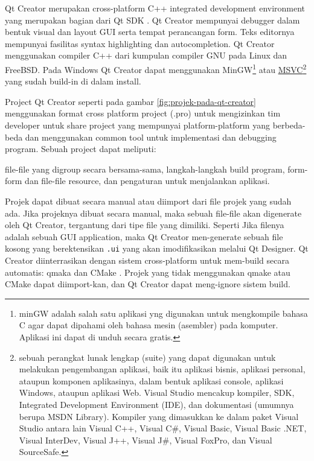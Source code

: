 Qt Creator merupakan cross-platform C++ integrated development
environment yang merupakan bagian dari Qt SDK . Qt Creator mempunyai
debugger dalam bentuk visual dan layout GUI  serta tempat perancangan
form. Teks editornya mempunyai fasilitas syntax highlighting dan
autocompletion. Qt Creator menggunakan compiler C++ dari kumpulan
compiler GNU pada Linux dan FreeBSD. Pada Windows  Qt Creator dapat
menggunakan MinGW\footnote{minGW adalah salah satu aplikasi yng
  digunakan untuk mengkompile bahasa C agar dapat dipahami oleh bahasa
  mesin (asembler) pada komputer. Aplikasi ini dapat di unduh secara
  gratis.} atau
\href{https://id.wikipedia.org/wiki/Microsoft_Visual_Studio_Express}{MSVC}\footnote{sebuah perangkat lunak lengkap (suite) yang dapat digunakan untuk melakukan pengembangan aplikasi, baik itu aplikasi bisnis, aplikasi personal, ataupun komponen aplikasinya, dalam bentuk aplikasi console, aplikasi Windows, ataupun aplikasi Web. Visual Studio mencakup kompiler, SDK, Integrated Development Environment (IDE), dan dokumentasi (umumnya berupa MSDN Library). Kompiler yang dimasukkan ke dalam paket Visual Studio antara lain Visual C++, Visual C\#, Visual Basic, Visual Basic .NET, Visual InterDev, Visual J++, Visual J\#, Visual FoxPro, dan Visual SourceSafe.}
yang sudah build-in di dalam install.

Project Qt Creator seperti pada gambar \ref{fig:projek-pada-qt-creator}
 menggunakan format cross platform project (.pro)
untuk mengizinkan tim developer untuk share project yang mempunyai
platform-platform yang berbeda-beda dan menggunakan common tool untuk
implementasi dan debugging program. Sebuah project dapat meliputi:

file-file yang digroup secara bersama-sama, langkah-langkah build
program, form-form dan file-file resource, dan pengaturan untuk
menjalankan aplikasi.

Projek dapat dibuat secara manual atau diimport dari file projek yang
sudah ada. Jika projeknya dibuat secara manual, maka sebuah file-file
akan digenerate oleh Qt Creator, tergantung dari tipe file yang
dimiliki. Seperti Jika filenya adalah sebuah GUI application, maka Qt
Creator men-generate sebuah file kosong yang berektensikan \texttt{.ui}
yang akan imodifikasikan melalui Qt Designer. Qt Creator diinterrasikan
dengan sistem cross-platform untuk mem-build secara automatis: qmaka dan CMake
. Projek yang tidak menggunakan qmake atau CMake dapat
diimport-kan, dan Qt Creator dapat meng-ignore sistem build.

